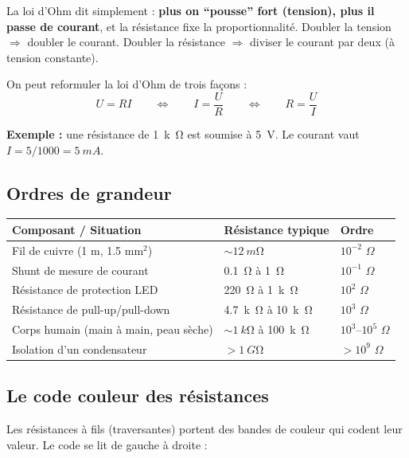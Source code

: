 \documentclass[12pt,a4paper,twoside]{book}
\begin{document}
\begin{intuition}
La loi d'Ohm dit simplement : \textbf{plus on ``pousse'' fort (tension), plus il passe de courant}, et la résistance fixe la proportionnalité. Doubler la tension $\Rightarrow$ doubler le courant. Doubler la résistance $\Rightarrow$ diviser le courant par deux (à tension constante).
\end{intuition}

On peut reformuler la loi d'Ohm de trois façons :
\[
U = RI \qquad \Longleftrightarrow \qquad I = \frac{U}{R} \qquad \Longleftrightarrow \qquad R = \frac{U}{I}
\]

\textbf{Exemple :} une résistance de \SI{1}{k\ohm} est soumise à \SI{5}{V}. Le courant vaut $I = 5/1000 = \SI{5}{mA}$.

\subsection{Ordres de grandeur}

\begin{center}
\begin{tabular}{lll}
\toprule
\textbf{Composant / Situation} & \textbf{Résistance typique} & \textbf{Ordre} \\
\midrule
Fil de cuivre (1 m, 1.5 mm$^2$) & $\sim \SI{12}{m\ohm}$ & $10^{-2}$ $\Omega$ \\
Shunt de mesure de courant & \SI{0.1}{\ohm} à \SI{1}{\ohm} & $10^{-1}$ $\Omega$ \\
Résistance de protection LED & \SI{220}{\ohm} à \SI{1}{k\ohm} & $10^{2}$ $\Omega$ \\
Résistance de pull-up/pull-down & \SI{4.7}{k\ohm} à \SI{10}{k\ohm} & $10^{3}$ $\Omega$ \\
Corps humain (main à main, peau sèche) & $\sim \SI{1}{k\ohm}$ à \SI{100}{k\ohm} & $10^{3}$--$10^{5}$ $\Omega$ \\
Isolation d'un condensateur & $> \SI{1}{G\ohm}$ & $> 10^{9}$ $\Omega$ \\
\bottomrule
\end{tabular}
\end{center}

\subsection{Le code couleur des résistances}

Les résistances à fils (traversantes) portent des bandes de couleur qui codent leur valeur. Le code se lit de gauche à droite :
\end{document}
